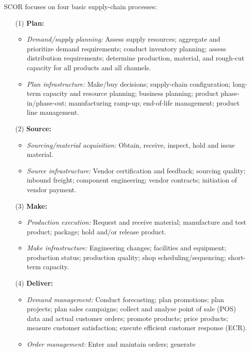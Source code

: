 \documentclass[11pt,a4paper]{article}
\begin{document}
SCOR focuses on four basic supply-chain processes:
\begin{itemize}
\item[(1)] \textbf{Plan:}
  \begin{itemize}
  \item \emph{Demand/supply planning:} Assess supply resources; aggregate and
    prioritize demand requirements; conduct inventory planning; assess
    distribution requirements; determine production, material, and rough-cut
    capacity for all products and all channels.
  \item \emph{Plan infrastructure:} Make/buy decisions; supply-chain
    configuration; long-term capacity and resource planning; business
    planning; product phase-in/phase-out; manufacturing ramp-up; end-of-life
    management; product line management.
  \end{itemize}
\item[(2)] \textbf{Source:}
  \begin{itemize}
  \item \emph{Sourcing/material acquisition:} Obtain, receive, inspect, hold
    and issue material.
  \item \emph{Source infrastructure:} Vendor certification and feedback;
    sourcing quality; inbound freight; component engineering; vendor
    contracts; initiation of vendor payment.  
  \end{itemize}
\item[(3)] \textbf{Make:}
  \begin{itemize}
  \item \emph{Production execution:} Request and receive material; manufacture
    and test product; package; hold and/or release product.
  \item \emph{Make infrastructure:} Engineering changes; facilities and
    equipment; production status; production quality; shop
    scheduling/sequencing; short-term capacity.
  \end{itemize}
\item[(4)] \textbf{Deliver:}
  \begin{itemize}
  \item \emph{Demand management:} Conduct forecasting; plan promotions; plan
    projects; plan sales campaigns; collect and analyse point of sale (POS)
    data and actual customer orders; promote products; price products; measure
    customer satisfaction; execute efficient customer response (ECR).
  \item \emph{Order management:} Enter and maintain orders; generate

\end{itemize}
\end{itemize}
\end{document}

